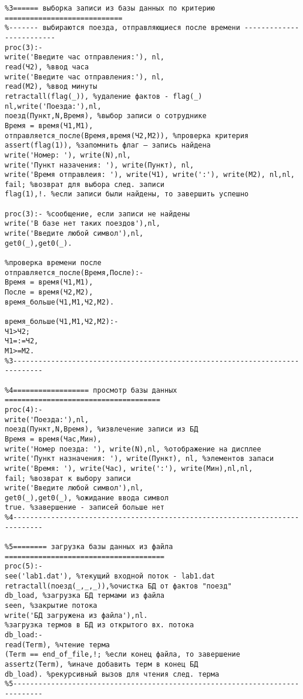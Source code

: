 \documentclass[a4paper,14pt]{extarticle}
\begin{document}
\begin{lstlisting}
%3====== выборка записи из базы данных по критерию ============================ 
%------- выбираются поезда, отправляющиеся после времени ------------------------- 
proc(3):- 
write('Введите час отправления:'), nl, 
read(Ч2), %ввод часа 
write('Введите час отправления:'), nl, 
read(М2), %ввод минуты 
retractall(flag(_)), %удаление фактов - flag(_) 
nl,write('Поезда:'),nl, 
поезд(Пункт,N,Время), %выбор записи о сотруднике 
Время = время(Ч1,М1), 
отправляется_после(Время,время(Ч2,М2)), %проверка критерия 
assert(flag(1)), %запомнить флаг – запись найдена 
write('Номер: '), write(N),nl, 
write('Пункт назачения: '), write(Пункт), nl, 
write('Время отправлеия: '), write(Ч1), write(':'), write(М2), nl,nl, 
fail; %возврат для выбора след. записи 
flag(1),!. %eсли записи были найдены, то завершить успешно 
  
proc(3):- %cообщение, если записи не найдены 
write('В базе нет таких поездов'),nl, 
write('Введите любой символ'),nl, 
get0(_),get0(_). 
  
%проверка времени после 
отправляется_после(Время,После):- 
Время = время(Ч1,М1), 
После = время(Ч2,М2), 
время_больше(Ч1,М1,Ч2,М2). 
  
время_больше(Ч1,М1,Ч2,М2):- 
Ч1>Ч2; 
Ч1=:=Ч2, 
М1>=М2. 
%3----------------------------------------------------------------------------- 
  
%4================== просмотр базы данных ===================================== 
proc(4):- 
write('Поезда:'),nl, 
поезд(Пункт,N,Время), %извлечение записи из БД 
Время = время(Час,Мин), 
write('Номер поезда: '), write(N),nl, %отображение на дисплее 
write('Пункт назначения: '), write(Пункт), nl, %элементов запаси 
write('Время: '), write(Час), write(':'), write(Мин),nl,nl, 
fail; %возврат к выбору записи 
write('Введите любой символ'),nl, 
get0(_),get0(_), %ожидание ввода символ 
true. %завершение - записей больше нет 
%4----------------------------------------------------------------------------- 
  
%5======== загрузка базы данных из файла ====================================== 
proc(5):- 
see('lab1.dat'), %текущий входной поток - lab1.dat 
retractall(поезд(_,_,_)),%очистка БД от фактов "поезд" 
db_load, %загрузка БД термами из файла 
seen, %закрытие потока 
write('БД загружена из файла'),nl. 
%загрузка термов в БД из открытого вх. потока 
db_load:- 
read(Term), %чтение терма 
(Term == end_of_file,!; %если конец файла, то завершение 
assertz(Term), %иначе добавить терм в конец БД 
db_load). %рекурсивный вызов для чтения след. терма 
%5----------------------------------------------------------------------------- 
  

\end{lstlisting}
\end{document}
